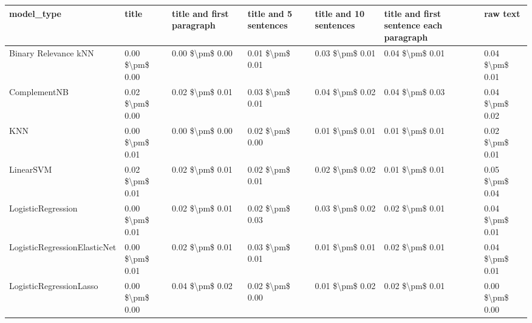 \begin{tabular}{lllllll}
\toprule
                     model\_type &           title & title and first paragraph & title and 5 sentences & title and 10 sentences & title and first sentence each paragraph &            raw text \\
\midrule
           Binary Relevance kNN & 0.00 \$\textbackslash pm\$ 0.00 &           0.00 \$\textbackslash pm\$ 0.00 &       0.01 \$\textbackslash pm\$ 0.01 &        0.03 \$\textbackslash pm\$ 0.01 &                         0.04 \$\textbackslash pm\$ 0.01 &     0.04 \$\textbackslash pm\$ 0.01 \\
                   ComplementNB & 0.02 \$\textbackslash pm\$ 0.00 &           0.02 \$\textbackslash pm\$ 0.01 &       0.03 \$\textbackslash pm\$ 0.01 &        0.04 \$\textbackslash pm\$ 0.02 &                         0.04 \$\textbackslash pm\$ 0.03 &     0.04 \$\textbackslash pm\$ 0.02 \\
                            KNN & 0.00 \$\textbackslash pm\$ 0.01 &           0.00 \$\textbackslash pm\$ 0.00 &       0.02 \$\textbackslash pm\$ 0.00 &        0.01 \$\textbackslash pm\$ 0.01 &                         0.01 \$\textbackslash pm\$ 0.01 &     0.02 \$\textbackslash pm\$ 0.01 \\
                      LinearSVM & 0.02 \$\textbackslash pm\$ 0.01 &           0.02 \$\textbackslash pm\$ 0.01 &       0.02 \$\textbackslash pm\$ 0.01 &        0.02 \$\textbackslash pm\$ 0.02 &                         0.01 \$\textbackslash pm\$ 0.01 &     0.05 \$\textbackslash pm\$ 0.04 \\
             LogisticRegression & 0.00 \$\textbackslash pm\$ 0.01 &           0.02 \$\textbackslash pm\$ 0.01 &       0.02 \$\textbackslash pm\$ 0.03 &        0.03 \$\textbackslash pm\$ 0.02 &                         0.02 \$\textbackslash pm\$ 0.01 &     0.04 \$\textbackslash pm\$ 0.01 \\
   LogisticRegressionElasticNet & 0.00 \$\textbackslash pm\$ 0.01 &           0.02 \$\textbackslash pm\$ 0.01 &       0.03 \$\textbackslash pm\$ 0.01 &        0.01 \$\textbackslash pm\$ 0.01 &                         0.02 \$\textbackslash pm\$ 0.01 &     0.04 \$\textbackslash pm\$ 0.01 \\
        LogisticRegressionLasso & 0.00 \$\textbackslash pm\$ 0.00 &           0.04 \$\textbackslash pm\$ 0.02 &       0.02 \$\textbackslash pm\$ 0.00 &        0.01 \$\textbackslash pm\$ 0.02 &                         0.02 \$\textbackslash pm\$ 0.01 &     0.00 \$\textbackslash pm\$ 0.00 \\

\end{tabular}
